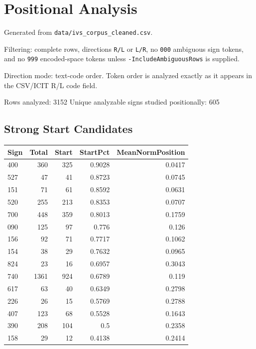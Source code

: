 ﻿\documentclass[11pt,a4paper]{article}
\begin{document}
\section*{Positional Analysis}

Generated from \texttt{data/ivs\_corpus\_cleaned.csv}.

Filtering: complete rows, directions \texttt{R/L} or \texttt{L/R}, no \texttt{000} ambiguous sign tokens, and no \texttt{999} encoded-space tokens unless \texttt{-IncludeAmbiguousRows} is supplied.

Direction mode: text-code order. Token order is analyzed exactly as it appears in the CSV/ICIT R/L code field.

Rows analyzed: 3152
Unique analyzable signs studied positionally: 605

\subsection*{Strong Start Candidates}

\begin{center}
\begin{tabular}{lrrrr}
\toprule
\textbf{Sign} & \textbf{Total} & \textbf{Start} & \textbf{StartPct} & \textbf{MeanNormPosition} \\
\midrule
400 & 360 & 325 & 0.9028 & 0.0417 \\
527 & 47 & 41 & 0.8723 & 0.0745 \\
151 & 71 & 61 & 0.8592 & 0.0631 \\
520 & 255 & 213 & 0.8353 & 0.0707 \\
700 & 448 & 359 & 0.8013 & 0.1759 \\
090 & 125 & 97 & 0.776 & 0.126 \\
156 & 92 & 71 & 0.7717 & 0.1062 \\
154 & 38 & 29 & 0.7632 & 0.0965 \\
824 & 23 & 16 & 0.6957 & 0.3043 \\
740 & 1361 & 924 & 0.6789 & 0.119 \\
617 & 63 & 40 & 0.6349 & 0.2798 \\
226 & 26 & 15 & 0.5769 & 0.2788 \\
407 & 123 & 68 & 0.5528 & 0.1643 \\
390 & 208 & 104 & 0.5 & 0.2358 \\
158 & 29 & 12 & 0.4138 & 0.2414 \\
\bottomrule
\end{tabular}
\end{center}
\end{document}

